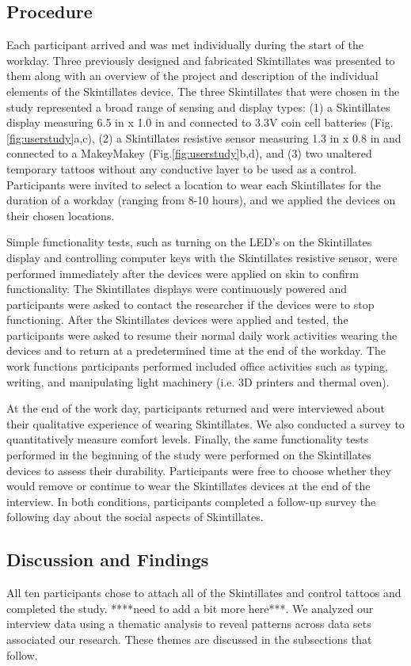 \documentclass{sigchi}
\begin{document}
\subsection {Procedure}
Each participant arrived and was met individually during the start of the workday.  Three previously designed and fabricated Skintillates was presented to them along with an overview of the project and description of the individual elements of the Skintillates device.  The three Skintillates that were chosen in the study represented a broad range of sensing and display types: (1) a Skintillates display measuring 6.5 in x 1.0 in and connected to 3.3V coin cell batteries (Fig.\ref{fig:userstudy}a,c), (2) a Skintillates resistive sensor measuring 1.3 in x 0.8 in and connected to a MakeyMakey (Fig.\ref{fig:userstudy}b,d), and (3) two unaltered temporary tattoos without any conductive layer to be used as a control. Participants were invited to select a location to wear each Skintillates for the duration of a workday (ranging from 8-10 hours), and we applied the devices on their chosen locations. 

Simple functionality tests, such as turning on the LED’s on the Skintillates display and controlling computer keys with the Skintillates resistive sensor, were performed immediately after the devices were applied on skin to confirm functionality. The Skintillates displays were continuously powered and participants were asked to contact the researcher if the devices were to stop functioning. After the Skintillates devices were applied and tested, the participants were asked to resume their normal daily work activities wearing the devices and to return at a predetermined time at the end of the workday. The work functions participants performed included office activities such as typing, writing, and manipulating light machinery (i.e. 3D printers and thermal oven).

At the end of the work day, participants returned and were interviewed about their qualitative experience of wearing Skintillates.  We also conducted a survey to  quantitatively measure comfort levels.   Finally, the same  functionality tests performed in the beginning of the study were performed on the Skintillates devices to assess their durability. Participants were free to choose whether they would remove or continue to wear the Skintillates devices at the end of the interview.    In both conditions, participants completed a follow-up survey the following day about the social aspects of Skintillates.
\subsection {Discussion and Findings}
All ten participants chose to attach all of the Skintillates and control tattoos and completed the study. ****need to add a bit more here***.  We analyzed our interview data using a thematic analysis to reveal patterns across data sets associated our research. These themes are discussed in the subsections that follow.
\end{document}
